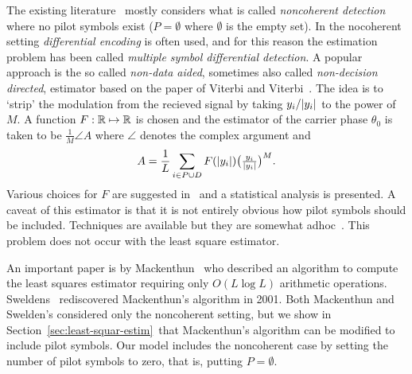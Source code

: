 \documentclass[journal]{IEEEtran}
\begin{document}
The existing literature~\cite{Mackenthun1994,Cowley_ref_sym_carr_1998,ViterbiViterbi_phase_est_1983,Sweldens2001,Wilson1989,Makrakis1990,Liu1991} mostly considers what is called \emph{noncoherent detection} where no pilot symbols exist ($P = \emptyset$ where $\emptyset$ is the empty set).  In the nocoherent setting \emph{differential encoding} is often used, and for this reason the estimation problem has been called \emph{multiple symbol differential detection}.  A popular approach is the so called \emph{non-data aided}, sometimes also called \emph{non-decision directed}, estimator based on the paper of Viterbi and Viterbi~\cite{ViterbiViterbi_phase_est_1983}.  The idea is to `strip' the modulation from the recieved signal by taking $y_i / {\left\vert y_i \right\vert}$ to the power of $M$.  A function $F: {\mathbb R} \mapsto {\mathbb R}$ is chosen and the estimator of the carrier phase $\theta_0$ is taken to be $\tfrac{1}{M}\angle{A}$ where $\angle$ denotes the complex argument and
\[
A = \frac{1}{L}\sum_{i \in P \cup D} F({\left\vert y_i \right\vert}) \big(\tfrac{y_i}{{\left\vert y_i \right\vert}}\big)^M.
\]
Various choices for $F$ are suggested in~\cite{ViterbiViterbi_phase_est_1983} and a statistical analysis is presented.  A caveat of this estimator is that it is not entirely obvious how pilot symbols should be included. Techniques are available but they are somewhat adhoc~\cite{Cowley_ref_sym_carr_1998}.  This problem does not occur with the least square estimator.

An important paper is by Mackenthun~\cite{Mackenthun1994} who described an algorithm to compute the least squares estimator requiring only $O(L \log L)$ arithmetic operations.  Sweldens~\cite{Sweldens2001} rediscovered Mackenthun's algorithm in 2001.  Both Mackenthun and Swelden's considered only the noncoherent setting, but we show in Section~\ref{sec:least-squar-estim}~that Mackenthun's algorithm can be modified to include pilot symbols. Our model includes the noncoherent case by setting the number of pilot symbols to zero, that is, putting $P = \emptyset$.  
\end{document}
